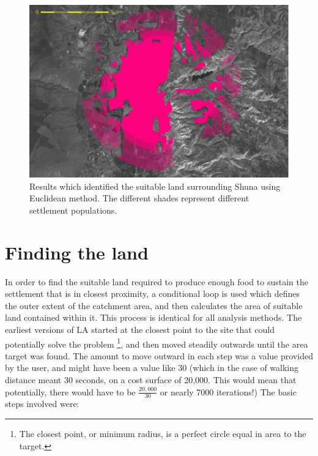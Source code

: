   \begin{figure}[htbp] %
  \includegraphics[scale=0.225]{./images/landcatchment.jpg}
    \caption{\label{fig:landCatchment}Results which identified the suitable
         land surrounding Shuna using Euclidean method.
   The different shades represent different settlement populations.}
   \end{figure}

\section{Finding the land} 

In order to find the suitable land required to produce enough food to sustain
the settlement that is in closest proximity, a conditional loop is used which
defines the outer extent of the catchment area, and then calculates the area of
suitable land contained within it.  This process is identical for all analysis
methods.  The earliest versions of LA started at the closest point to the site
that could potentially solve the problem \footnote{The closest point, or
minimum radius, is a perfect circle equal in area to the target.}, and then
moved steadily outwards until the area target was found.  The amount to move
outward in each step was a value provided by the user, and might have been a
value like 30 (which in the case of walking distance meant 30 seconds, on  a
cost surface of 20,000.  This would mean that potentially, there would have to
be $\frac{20,000}{30}$ or nearly 7000 iterations!)
The basic steps involved were:

